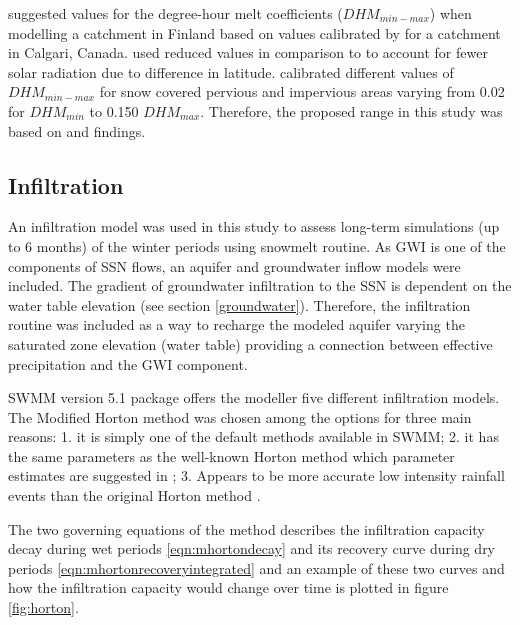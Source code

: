 \citeauthor{Tikkanen2013} \citeyearpar{Tikkanen2013} suggested values for the degree-hour melt coefficients ($DHM_{min - max}$) when modelling a catchment in Finland based on values calibrated by \citeauthor{valeo2004} \citeyearpar{valeo2004} for a catchment in Calgari, Canada. \citeauthor{Tikkanen2013} used reduced values in comparison to \citeauthor{valeo2004} to account for fewer solar radiation due to difference in latitude. \citeauthor{valeo2004} calibrated different values of $DHM_{min - max}$ for snow covered pervious and impervious areas varying from 0.02 for $DHM_{min}$ to 0.150 $DHM_{max}$. Therefore, the proposed range in this study was based on \citeauthor{Tikkanen2013} and \citeauthor{valeo2004} findings.


\subsection{Infiltration} \label{infiltration}

An infiltration model was used in this study to assess long-term simulations (up to 6 months) of the winter periods using snowmelt routine. As \acf{GWI} is one of the components of \acf{SSN} flows, an aquifer and groundwater inflow models were included. The gradient of groundwater infiltration to the \ac{SSN} is dependent on the water table elevation (see section \ref{groundwater}). Therefore, the infiltration routine was included as a way to recharge the modeled aquifer varying the saturated zone elevation (water table) providing a connection between effective precipitation and the \ac{GWI} component.

SWMM version 5.1 package offers the modeller five different infiltration models. The Modified Horton method \cite{akan1992,akan2003} was chosen among the options for three main reasons: 1. it is simply one of the default methods available in SWMM;  2. it has the same parameters as the well-known Horton method which parameter estimates are suggested in \citet{Rossman2016}; 3. Appears to be more accurate low intensity rainfall events than the original Horton method \cite{Rossman2016}. 

The two governing equations of the method describes the infiltration capacity decay during wet periods \ref{eqn:mhortondecay} and its recovery curve during dry periods \ref{eqn:mhortonrecoveryintegrated} and an example of these two curves and how the infiltration capacity would change over time is plotted in figure \ref{fig:horton}. 

